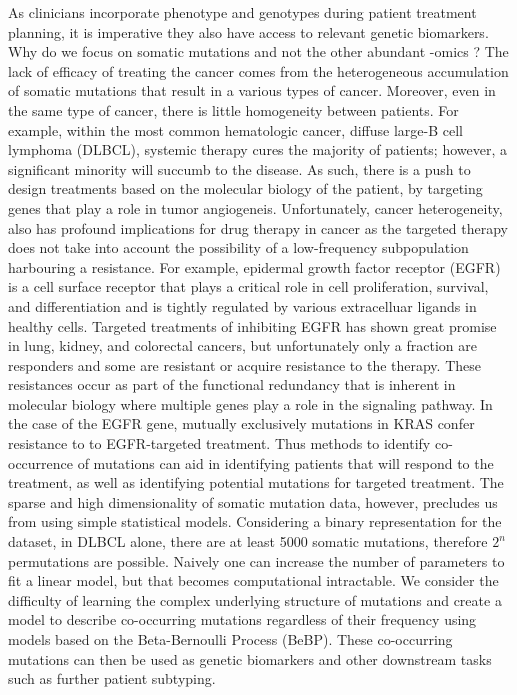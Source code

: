 As clinicians incorporate phenotype and genotypes during patient treatment planning, it is imperative they also have access to relevant genetic biomarkers.  Why do we focus on somatic mutations and not the other abundant -omics ?  The lack of efficacy of treating the cancer comes from the heterogeneous accumulation of somatic mutations that result in a various types of cancer.  Moreover, even in the same type of cancer, there is little homogeneity between patients.  For example, within the most common hematologic cancer, diffuse large-B cell lymphoma (DLBCL), systemic therapy cures the majority of patients; however, a significant minority will succumb to the disease.  As such, there is a push to design treatments based on the molecular biology of the patient, by targeting genes that play a role in tumor angiogeneis.  Unfortunately, cancer heterogeneity, also has profound implications for drug therapy in cancer as the targeted therapy does not take into account the possibility of a low-frequency subpopulation harbouring a resistance.  For example, epidermal growth factor receptor (EGFR) is a cell surface receptor that plays a critical role in cell proliferation, survival, and differentiation and is tightly regulated by various extracelluar ligands in healthy cells. Targeted treatments of inhibiting EGFR has shown great promise in lung, kidney, and colorectal cancers, but unfortunately only a fraction are responders and some are resistant or acquire resistance to the therapy.  These resistances occur as part of the functional redundancy that is inherent in molecular biology where multiple genes play a role in the signaling pathway.  In the case of the EGFR gene, mutually exclusively mutations in KRAS confer resistance to to EGFR-targeted treatment.  Thus methods to identify co-occurrence of mutations can aid in identifying patients that will respond to the treatment, as well as identifying potential mutations for targeted treatment.  The sparse and high dimensionality of somatic mutation data, however, precludes us from using simple statistical models.  Considering a binary representation for the dataset, in DLBCL alone, there are at least 5000 somatic mutations, therefore $2^{n}$ permutations are possible.  Naively one can increase the number of parameters to fit a linear model, but that becomes computational intractable.  We consider the difficulty of learning the complex underlying structure of mutations and create a model to describe co-occurring mutations regardless of their frequency using models based on the Beta-Bernoulli Process (BeBP).  These co-occurring mutations can then be used as genetic biomarkers and other downstream tasks such as further patient subtyping.

